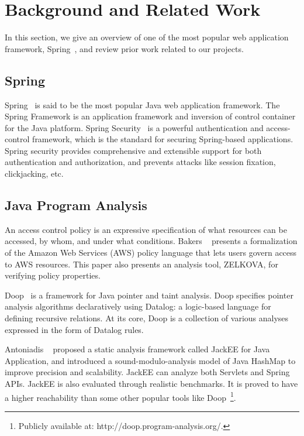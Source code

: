 \section{Background and Related Work} %
In this section, we give an overview of one of the most popular web application
framework, Spring~\cite{spring+security:home}, and review prior work related to
our projects.

\subsection{Spring}

Spring~\cite{spring+security:home} is said to be the most popular Java web
application framework.
%
The Spring Framework is an application framework and inversion of control
container for the Java platform.
%
Spring Security~\cite{spring+security:method} is a powerful authentication and
access-control framework, which is the standard for securing Spring-based
applications.
%
Spring security provides comprehensive and extensible support for both
authentication and authorization, and prevents attacks like session fixation,
clickjacking, etc.

\subsection{Java Program Analysis}

An access control policy is an expressive specification of what resources can be accessed, by whom, and under what conditions. Bakers \etal~\cite{Backes+etal:2018:Zelkova} presents a formalization of the Amazon Web Services (AWS) policy language  that lets users govern access to AWS resources. This paper also presents an analysis tool, ZELKOVA, for verifying policy properties.

Doop~\cite{Bravenboer:2009:Doop} is a framework for Java pointer and taint
analysis.
%
Doop specifies pointer analysis algorithms declaratively using Datalog: a
logic-based language for defining recursive relations.
%
At its core, Doop is a collection of various analyses expressed in the form of
Datalog rules.

Antoniadis \etal~\cite{Antoniadis+etal:2020:Java} proposed a static
analysis framework called JackEE for Java Application, and introduced a
sound-modulo-analysis model of Java HashMap to improve precision and
scalability. JackEE can analyze both Servlets and Spring APIs. JackEE is also
evaluated through realistic benchmarks. It is proved to have a higher
reachability than some other popular tools like Doop~\footnote{Publicly
  available at: http://doop.program-analysis.org/.}.

